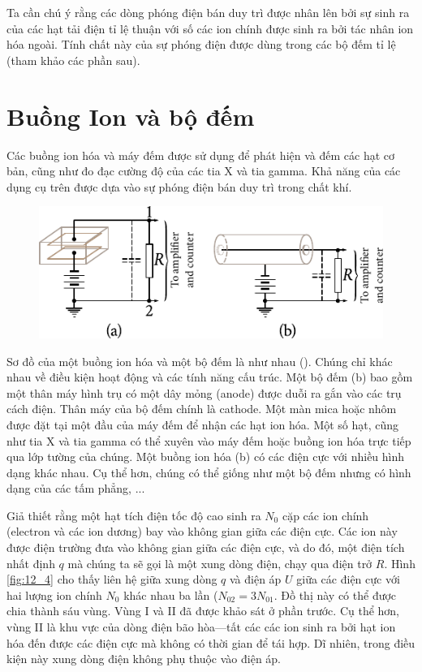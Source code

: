 Ta cần chú ý rằng các dòng phóng điện bán duy trì được nhân lên bởi sự sinh ra của các hạt tải điện tỉ lệ thuận với số các ion chính được sinh ra bởi tác nhân ion hóa ngoài.
Tính chất này của sự phóng điện được dùng trong các bộ đếm tỉ lệ (tham khảo các phần sau).

\section{Buồng Ion và bộ đếm}\label{sec:12_3}

Các buồng ion hóa và máy đếm được sử dụng để phát hiện và đếm các hạt cơ bản, cũng như đo đạc cường độ của các tia X và tia gamma.
Khả năng của các dụng cụ trên được dựa vào sự phóng điện bán duy trì trong chất khí.

\begin{figure}[t]
	\begin{center}
		\includegraphics[scale=1]{figures/ch_12/fig_12_3.pdf}
		\caption[]{}
		\label{fig:12_3}
	\end{center}
	\vspace{-0.8cm}
\end{figure}

Sơ đồ của một buồng ion hóa và một bộ đếm là như nhau ().
Chúng chỉ khác nhau về điều kiện hoạt động và các tính năng cấu trúc.
Một bộ đếm (b) bao gồm một thân máy hình trụ có một dây mỏng (anode) được duỗi ra gắn vào các trụ cách điện.
Thân máy của bộ đếm chính là cathode.
Một màn mica hoặc nhôm được đặt tại một đầu của máy đếm để nhận các hạt ion hóa.
Một số hạt, cũng như tia X và tia gamma có thể xuyên vào máy đếm hoặc buồng ion hóa trực tiếp qua lớp tường của chúng.
Một buồng ion hóa (b) có các điện cực với nhiều hình dạng khác nhau.
Cụ thể hơn, chúng có thể giống như một bộ đếm nhưng có hình dạng của các tấm phẳng, ...

Giả thiết rằng một hạt tích điện tốc độ cao sinh ra $N_0$ cặp các ion chính (electron và các ion dương) bay vào không gian giữa các điện cực.
Các ion này được điện trường đưa vào không gian giữa các điện cực, và do đó, một điện tích nhất định $q$ mà chúng ta sẽ gọi là một xung dòng điện, chạy qua điện trở $R$.
Hình \ref{fig:12_4} cho thấy liên hệ giữa xung dòng $q$ và điện áp $U$ giữa các điện cực với hai lượng ion chính $N_0$ khác nhau ba lần ($N_{02} = 3N_{01}$.
Đồ thị này có thể được chia thành sáu vùng.
Vùng I và II đã được khảo sát ở phần trước.
Cụ thể hơn, vùng II là khu vực của dòng điện bão hòa---tất các các ion sinh ra bởi hạt ion hóa đến được các điện cực mà không có 
thời gian để tái hợp.
Dĩ nhiên, trong điều kiện này xung dòng điện không phụ thuộc vào điện áp.

